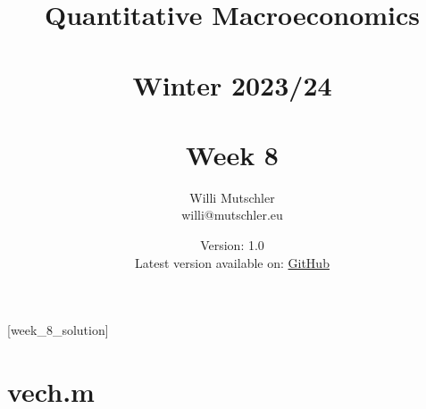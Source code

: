 
\newif\ifDisplaySolutions%


\title{Quantitative Macroeconomics\\~\\Winter 2023/24\\~\\Week 8}
\author{Willi Mutschler\\willi@mutschler.eu}
\date{Version: 1.0\\Latest version available on: \href{https://github.com/wmutschl/Quantitative-Macroeconomics/releases/latest/download/week_8.pdf}{GitHub}}
\maketitle\thispagestyle{empty}

\newpage
{}[week_8_solution]
\tableofcontents\thispagestyle{empty}\newpage

\setcounter{page}{1}
\newpage
\newpage
\newpage
\newpage

\printbibliography
\appendix
\section{vech.m}



\ifDisplaySolutions
\newpage
\appendix
\section{Solutions}

\fi
